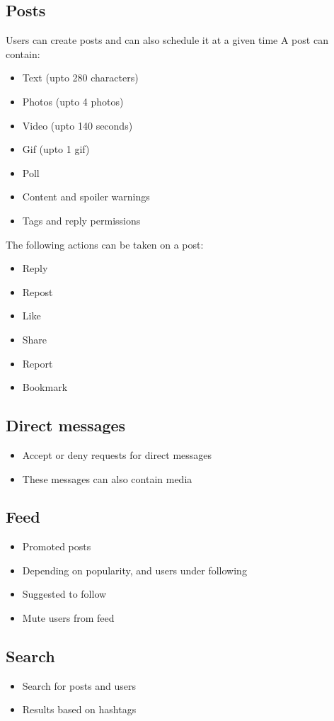 \documentclass[journal,12pt,onecolumn]{IEEEtran}
\begin{document}
\subsection*{\textbf{Posts}}
Users can create posts and can also schedule it at a given time
A post can contain:
\begin{itemize}
    \item Text (upto 280 characters)
    \item Photos (upto 4 photos)
    \item Video (upto 140 seconds)
    \item Gif (upto 1 gif)
    \item Poll
    \item Content and spoiler warnings
    \item Tags and reply permissions
\end{itemize}
The following actions can be taken on a post:
\begin{itemize}
    \item Reply 
    \item Repost
    \item Like 
    \item Share
    \item Report
    \item Bookmark
\end{itemize}
%
\subsection*{\textbf{Direct messages}}
\begin{itemize}
    \item Accept or deny requests for direct messages
    \item These messages can also contain media
\end{itemize}
%
\subsection*{\textbf{Feed}}
\begin{itemize}
    \item Promoted posts
    \item Depending on popularity, and users under following
    \item Suggested to follow
    \item Mute users from feed
\end{itemize}
%
\subsection*{\textbf{Search}}
\begin{itemize}
    \item Search for posts and users
    \item Results based on hashtags 
\end{itemize}
%
\end{document}
